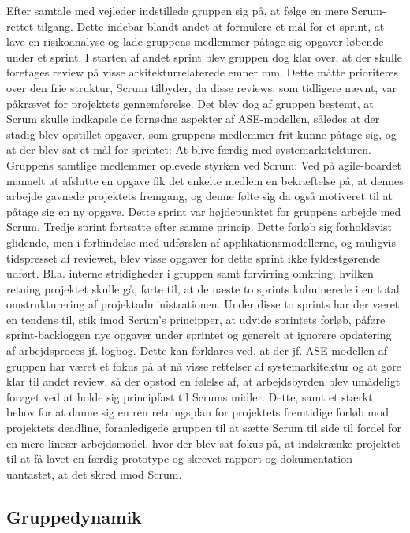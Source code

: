 Efter samtale med vejleder indstillede gruppen sig på, at følge en mere Scrum-rettet tilgang. Dette indebar blandt andet at formulere et mål for et sprint, at 
lave en risikoanalyse og lade gruppens medlemmer påtage sig opgaver løbende under et sprint. I starten af andet sprint blev gruppen dog klar over, at der skulle 
foretages review på visse arkitekturrelaterede emner mm. Dette måtte prioriteres over den frie struktur, Scrum tilbyder, da disse reviews, som tidligere nævnt, 
var påkrævet for projektets gennemførelse. Det blev dog af gruppen bestemt, at Scrum skulle indkapsle de fornødne aspekter af ASE-modellen, således at der 
stadig blev opstillet opgaver, som gruppens medlemmer frit kunne påtage sig, og at der blev sat et mål for sprintet: At blive færdig med systemarkitekturen. 
Gruppens samtlige medlemmer oplevede styrken ved Scrum: Ved på agile-boardet manuelt at afslutte en opgave fik det enkelte medlem en 
bekræftelse på, at dennes arbejde gavnede projektets fremgang, og denne følte sig da også motiveret til at påtage sig en ny opgave. Dette sprint var 
højdepunktet for gruppens arbejde med Scrum. Tredje sprint fortsatte efter samme princip. Dette forløb sig forholdsvist glidende, men i forbindelse med
udførslen af 
applikationsmodellerne, og muligvis tidspresset af reviewet, blev visse opgaver for dette sprint ikke fyldestgørende udført. Bl.a. interne stridigheder i 
gruppen samt forvirring omkring, hvilken retning projektet skulle gå, førte til, at de næste to sprints kulminerede i en total omstrukturering af 
projektadministrationen. Under disse to sprints har der været en tendens til, stik imod Scrum's principper, at udvide sprintets forløb, påføre sprint-backloggen
nye opgaver under sprintet og generelt at 
ignorere opdatering af arbejdsproces jf. logbog. Dette kan forklares ved, at der jf. ASE-modellen af gruppen har været et fokus på at nå visse rettelser af 
systemarkitektur og at gøre klar til andet review, så der opstod en følelse af, at arbejdsbyrden blev umådeligt forøget ved at holde sig principfast til Scrums
 midler. Dette, samt
et stærkt behov for at danne sig en ren retningsplan for projektets fremtidige forløb mod projektets deadline, foranledigede gruppen til at sætte Scrum til 
side til fordel for en mere lineær arbejdsmodel, hvor der blev sat fokus på, at indskrænke projektet til at få lavet en færdig prototype og skrevet rapport og 
dokumentation uantastet, at det skred imod Scrum.


\subsection{Gruppedynamik}
